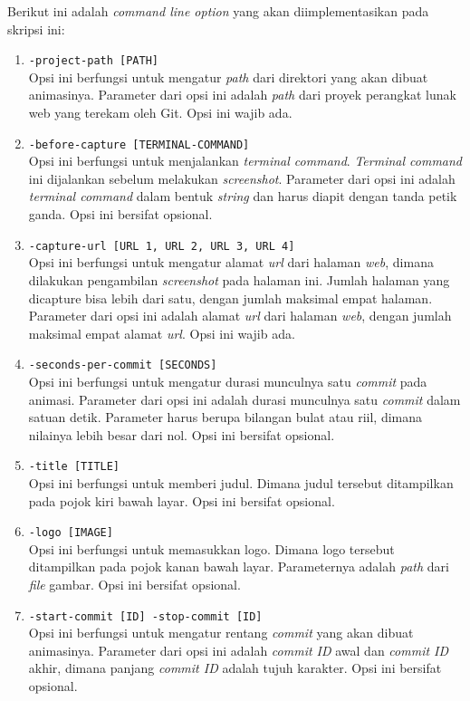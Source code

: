 Berikut ini adalah \textit{command line option} yang akan diimplementasikan pada skripsi ini:
\begin{enumerate}
\item \texttt{-project-path [PATH]}\\
Opsi ini berfungsi untuk mengatur \textit{path} dari direktori yang akan dibuat animasinya. Parameter dari opsi ini adalah \textit{path} dari proyek perangkat lunak web yang terekam oleh Git. Opsi ini wajib ada.

\item \texttt{-before-capture [TERMINAL-COMMAND]}\\
Opsi ini berfungsi untuk menjalankan \textit{terminal command}. \textit{Terminal command} ini dijalankan sebelum melakukan \textit{screenshot}. Parameter dari opsi ini adalah \textit{terminal command} dalam bentuk \textit{string} dan harus diapit dengan tanda petik ganda. Opsi ini bersifat opsional.

\item \texttt{-capture-url [URL 1, URL 2, URL 3, URL 4]}\\
Opsi ini berfungsi untuk mengatur alamat \textit{url} dari halaman \textit{web}, dimana dilakukan pengambilan \textit{screenshot} pada halaman ini. Jumlah halaman yang dicapture bisa lebih dari satu, dengan jumlah maksimal empat halaman. Parameter dari opsi ini adalah alamat \textit{url} dari halaman \textit{web}, dengan jumlah maksimal empat alamat \textit{url}. Opsi ini wajib ada.

\item \texttt{-seconds-per-commit [SECONDS]}\\
Opsi ini berfungsi untuk mengatur durasi munculnya satu \textit{commit} pada animasi. Parameter dari opsi ini adalah durasi munculnya satu \textit{commit} dalam satuan detik. Parameter harus berupa bilangan bulat atau riil, dimana nilainya lebih besar dari nol. Opsi ini bersifat opsional.

\item \texttt{-title [TITLE]}\\
Opsi ini berfungsi untuk memberi judul. Dimana judul tersebut ditampilkan pada pojok kiri
bawah layar. Opsi ini bersifat opsional. 

\item \texttt{-logo [IMAGE]}\\
Opsi ini berfungsi untuk memasukkan logo. Dimana logo tersebut ditampilkan pada pojok kanan
bawah layar. Parameternya adalah \textit{path} dari \textit{file} gambar. Opsi ini bersifat opsional.

\item \texttt{-start-commit [ID] -stop-commit [ID]}\\
Opsi ini berfungsi untuk mengatur rentang \textit{commit} yang akan dibuat animasinya. Parameter dari opsi ini adalah \textit{commit ID} awal dan \textit{commit ID} akhir, dimana panjang \textit{commit ID} adalah tujuh karakter. Opsi ini bersifat opsional. 
\end{enumerate}

